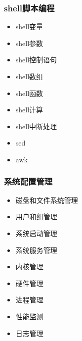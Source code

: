 \documentclass[xcolor=svgnames,presentation]{beamer}
\begin{document}
\begin{frame}
\frametitle{shell脚本编程}
\label{sec-1-2-2}
\begin{itemize}

\item shell变量
\label{sec-1-2-2-1}%

\item shell参数
\label{sec-1-2-2-2}%

\item shell控制语句
\label{sec-1-2-2-3}%

\item shell数组
\label{sec-1-2-2-4}%

\item shell函数
\label{sec-1-2-2-5}%

\item shell计算
\label{sec-1-2-2-6}%

\item shell中断处理
\label{sec-1-2-2-7}%

\item sed
\label{sec-1-2-2-8}%

\item awk
\label{sec-1-2-2-9}%
\end{itemize} %
\end{frame}
\begin{frame}
\frametitle{系统配置管理}
\label{sec-1-2-3}
\begin{itemize}

\item 磁盘和文件系统管理
\label{sec-1-2-3-1}%

\item 用户和组管理
\label{sec-1-2-3-2}%

\item 系统启动管理
\label{sec-1-2-3-3}%

\item 系统服务管理
\label{sec-1-2-3-4}%

\item 内核管理
\label{sec-1-2-3-5}%

\item 硬件管理
\label{sec-1-2-3-6}%

\item 进程管理
\label{sec-1-2-3-7}%

\item 性能监测
\label{sec-1-2-3-8}%

\item 日志管理
\label{sec-1-2-3-9}%
\end{itemize} %
\end{frame}
\end{document}
